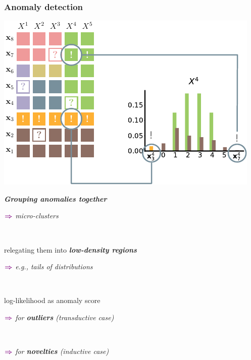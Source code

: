 \documentclass[xcolor={usenames,dvipsnames,svgnames}, compress, aspectratio=169, 11pt]{beamer}
\newcommand{\comment}[3][\small]{\begin{minipage}{1\linewidth}
          \raggedleft
          {
            $\color{violet}\boldsymbol\Rightarrow$
            #1
            {\emph{#2}}
          }
      \end{minipage}#3\\
}
\begin{document}
\begin{frame}[t, htt=bgrey2]
  \frametitle{Anomaly detection}

  \large
  \begin{minipage}[t]{0.5\linewidth}
    \vspace{6pt}
    \includegraphics[width=1.04\linewidth]{figures/abda-anomaly}
  \end{minipage}\hfill\begin{minipage}[t]{0.43\linewidth}
    \raggedright
    \vspace{10pt}

    \emph{\textbf{Grouping anomalies together}}\\
    \comment[\small]{micro-clusters}{}
    \vspace{20pt}

    relegating them into \emph{\textbf{low-density regions}}\\[-12pt]
    \comment[\small]{e.g., tails of distributions}{}
    \vspace{20pt}
    
    log-likelihood as anomaly score\\
    \comment[\small]{for \textbf{\textbf{outliers}} (transductive case)}{}
    \comment[\small]{for {\textbf{novelties}} (inductive case)}{}
    
     
    
  \end{minipage}  
\end{frame}
\end{document}
